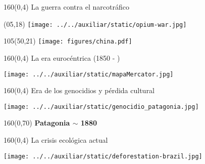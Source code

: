 \documentclass[shownotes,aspectratio=169]{beamer}
\begin{document}
\begin{frame}[plain]
\begin{textblock}{160}(0,4)
  \LARGE \centering \textcolor{black!85}{La guerra contra el narcotráfico}
 \end{textblock} 
\vspace{1cm}

\centering

\begin{textblock}{45}(05,18)
\texttt{[image: ../../auxiliar/static/opium-war.jpg]}  
\end{textblock} 

\begin{textblock}{105}(50,21)
\texttt{[image: figures/china.pdf]}
\end{textblock} 

\end{frame}

\begin{frame}[plain]
\begin{textblock}{160}(0,4)
  \LARGE \centering \textcolor{black!85}{La era eurocéntrica (1850 - )}
 \end{textblock} 

\vspace{1cm}
 \centering
\texttt{[image: ../../auxiliar/static/mapaMercator.jpg]}
\end{frame} 


\begin{frame}[plain]
\begin{textblock}{160}(0,4)
  \LARGE \centering \textcolor{black!85}{Era de los genocidios y pérdida cultural}
 \end{textblock} 

\vspace{1cm}
 \centering
\texttt{[image: ../../auxiliar/static/genocidio\_patagonia.jpg]}

\begin{textblock}{160}(0,70)
  \centering \textcolor{black!15}{\textbf{Patagonia $\sim$ 1880}}
 \end{textblock} 


\end{frame} 


\begin{frame}[plain]
\begin{textblock}{160}(0,4)
  \LARGE \centering \textcolor{black!85}{La crisis ecológica actual}
 \end{textblock} 

\vspace{1cm}
 \centering
\texttt{[image: ../../auxiliar/static/deforestation-brazil.jpg]}
\end{frame} 
\end{document}
